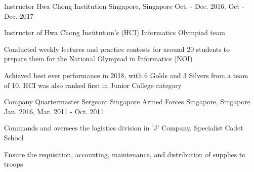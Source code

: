 \begin{cventries}
  \cventry
    {Instructor} %
    {Hwa Chong Institution} %
    {Singapore, Singapore} %
    {Oct. - Dec. 2016, Oct - Dec. 2017} %
    {
      \begin{cvitems} %
      \item { Instructor of Hwa Chong Institution’s (HCI) Informatics Olympiad team}
      \item { Conducted weekly lectures and practice contests for around 20 students to prepare them for the National Olympiad in Informatics (NOI)}
      \item { Achieved best ever performance in 2018, with 6 Golds and 3 Silvers from a team of 10. HCI was also ranked first in Junior College category}
      \end{cvitems}
    }

  \cventry
    {Company Quartermaster Sergeant} %
    {Singapore Armed Forces} %
    {Singapore, Singapore} %
    {Jan. 2016, Mar. 2011 - Oct. 2011} %
    {
      \begin{cvitems} %
      \item {Commands and oversees the logistics division in ’J’ Company, Specialist Cadet School}
      \item {Ensure the requisition, accounting, maintenance, and distribution of supplies to troops}
      \end{cvitems}
    }

\end{cventries}
